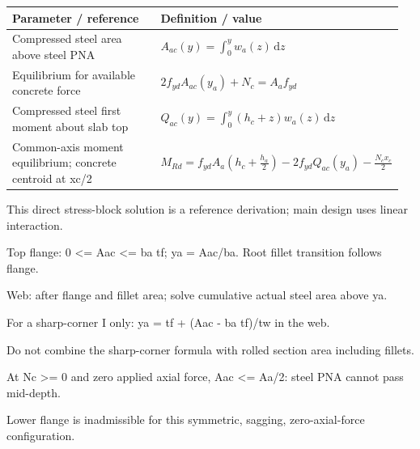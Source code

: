 \documentclass[a4paper,10pt]{article}
\begin{document}
\Needspace{25mm}\begin{longtable}{@{}p{0.53\linewidth}p{0.43\linewidth}@{}}\rowcolor{light}\textbf{Parameter / reference} & \textbf{Definition / value}\\\midrule
{\small Compressed steel area above steel PNA} & {\small $A_{ac}(y)=\int_0^y w_a(z)\,\mathrm{d}z$}\\[5pt]
{\small Equilibrium for available concrete force} & {\small $2f_{yd}A_{ac}(y_a)+N_c=A_a f_{yd}$}\\[5pt]
{\small Compressed steel first moment about slab top} & {\small $Q_{ac}(y)=\int_0^y\left(h_c+z\right)w_a(z)\,\mathrm{d}z$}\\[5pt]
{\small Common-axis moment equilibrium; concrete centroid at xc/2} & {\small $M_{Rd}=f_{yd}A_a\left(h_c+\frac{h_a}{2}\right)-2f_{yd}Q_{ac}(y_a)-\frac{N_c x_c}{2}$}\\[5pt]\bottomrule\end{longtable}
{\small\color{muted}This direct stress-block solution is a reference derivation; main design uses linear interaction.}\par
\Needspace{22mm}\par
{\small\color{muted}Top flange: 0 <= Aac <= ba tf; ya = Aac/ba. Root fillet transition follows flange.}\par
{\small\color{muted}Web: after flange and fillet area; solve cumulative actual steel area above ya.}\par
{\small\color{muted}For a sharp-corner I only: ya = tf + (Aac - ba tf)/tw in the web.}\par
{\small\color{muted}Do not combine the sharp-corner formula with rolled section area including fillets.}\par
{\small\color{muted}At Nc >= 0 and zero applied axial force, Aac <= Aa/2: steel PNA cannot pass mid-depth.}\par
{\small\color{muted}Lower flange is inadmissible for this symmetric, sagging, zero-axial-force configuration.}\par
\end{document}
